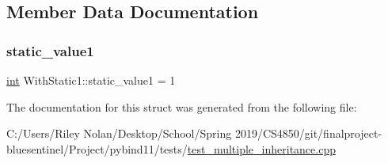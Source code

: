 \subsection{Member Data Documentation}
\mbox{\label{struct_with_static1_a5f2091146c7d5026d1f6f4df3748cea8}} 
\subsubsection{\texorpdfstring{static\_value1}{static\_value1}}
{\footnotesize\ttfamily \mbox{\hyperlink{warnings_8h_a74f207b5aa4ba51c3a2ad59b219a423b}{int}} With\+Static1\+::static\+\_\+value1 = 1\hspace{0.3cm}{\ttfamily [static]}}



The documentation for this struct was generated from the following file\+:\begin{DoxyCompactItemize}
\item 
C\+:/\+Users/\+Riley Nolan/\+Desktop/\+School/\+Spring 2019/\+C\+S4850/git/finalproject-\/bluesentinel/\+Project/pybind11/tests/\mbox{\hyperlink{test__multiple__inheritance_8cpp}{test\+\_\+multiple\+\_\+inheritance.\+cpp}}\end{DoxyCompactItemize}
